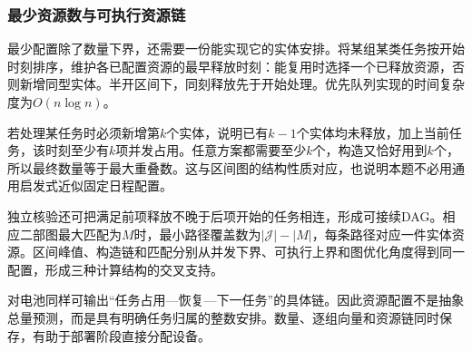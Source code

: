 \subsubsection{最少资源数与可执行资源链}
最少配置除了数量下界，还需要一份能实现它的实体安排。将某组某类任务按开始时刻排序，维护各已配置资源的最早释放时刻：能复用时选择一个已释放资源，否则新增同型实体。半开区间下，同刻释放先于开始处理。优先队列实现的时间复杂度为$O(n\log n)$。

若处理某任务时必须新增第$k$个实体，说明已有$k-1$个实体均未释放，加上当前任务，该时刻至少有$k$项并发占用。任意方案都需要至少$k$个，构造又恰好用到$k$个，所以最终数量等于最大重叠数。这与区间图的结构性质对应\cite{fulkerson1965interval}，也说明本题不必用通用启发式近似固定日程配置。

独立核验还可把满足前项释放不晚于后项开始的任务相连，形成可接续DAG。相应二部图最大匹配为$M$时，最小路径覆盖数为$|\mathcal J|-|M|$，每条路径对应一件实体资源。区间峰值、构造链和匹配分别从并发下界、可执行上界和图优化角度得到同一配置，形成三种计算结构的交叉支持。

对电池同样可输出“任务占用—恢复—下一任务”的具体链。因此资源配置不是抽象总量预测，而是具有明确任务归属的整数安排。数量、逐组向量和资源链同时保存，有助于部署阶段直接分配设备。
